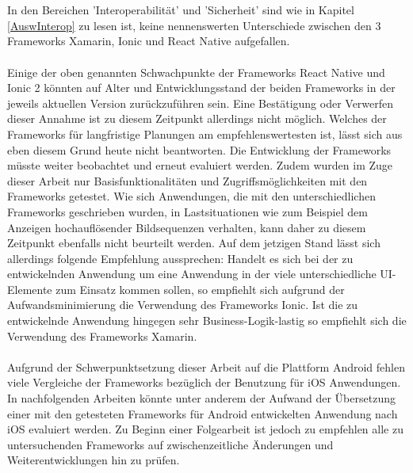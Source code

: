 \\
\\
In den Bereichen 'Interoperabilität' und 'Sicherheit' sind wie in Kapitel \ref{AuswInterop} zu lesen ist, keine nennenswerten Unterschiede zwischen den 3 Frameworks Xamarin, Ionic und React Native aufgefallen.
\\
\\
Einige der oben genannten Schwachpunkte der Frameworks React Native und Ionic 2 könnten auf Alter und Entwicklungsstand der beiden Frameworks in der jeweils aktuellen Version zurückzuführen sein. Eine Bestätigung oder Verwerfen dieser Annahme ist zu diesem Zeitpunkt allerdings nicht möglich. Welches der Frameworks für langfristige Planungen am empfehlenswertesten ist, lässt sich aus eben diesem Grund heute nicht beantworten. Die Entwicklung der Frameworks müsste weiter beobachtet und erneut evaluiert werden. Zudem wurden im Zuge dieser Arbeit nur Basisfunktionalitäten und Zugriffsmöglichkeiten mit den Frameworks getestet. Wie sich Anwendungen, die mit den unterschiedlichen Frameworks geschrieben wurden, in Lastsituationen wie zum Beispiel dem Anzeigen hochauflösender Bildsequenzen verhalten, kann daher zu diesem Zeitpunkt ebenfalls nicht beurteilt werden. Auf dem jetzigen Stand lässt sich allerdings folgende Empfehlung aussprechen: Handelt es sich bei der zu entwickelnden Anwendung um eine Anwendung in der viele unterschiedliche UI-Elemente zum Einsatz kommen sollen, so empfiehlt sich aufgrund der Aufwandsminimierung die Verwendung des Frameworks Ionic. Ist die zu entwickelnde Anwendung hingegen sehr Business-Logik-lastig so empfiehlt sich die Verwendung des Frameworks Xamarin. 
\\
\\
Aufgrund der Schwerpunktsetzung dieser Arbeit auf die Plattform Android fehlen viele Vergleiche der Frameworks bezüglich der Benutzung für iOS Anwendungen. In nachfolgenden Arbeiten könnte unter anderem der Aufwand der Übersetzung einer mit den getesteten Frameworks für Android entwickelten Anwendung nach iOS evaluiert werden. Zu Beginn einer Folgearbeit ist jedoch zu empfehlen alle zu untersuchenden Frameworks auf zwischenzeitliche Änderungen und Weiterentwicklungen hin zu prüfen. 